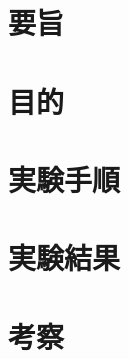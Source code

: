 \documentclass[a4paper,11pt]{ltjsarticle}
\begin{document}
\section{要旨}
\section{目的}
\section{実験手順}
\section{実験結果}
\section{考察}
\end{document}
